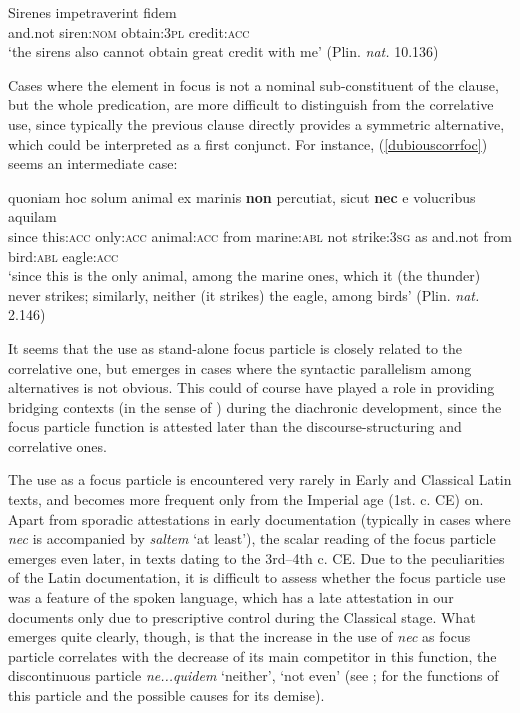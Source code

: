 \documentclass[output=paper,modfonts,nonflat,citecolor=brown,
showindex
]{langsci/langscibook}
\begin{document}
{\begin{exe}
\ex \label{focussirens}  Sirenes impetraverint fidem\\
and.not siren:{\textsc{nom}} obtain:{\textsc{3pl}} credit:{\textsc{acc}}\\

`the sirens also cannot obtain great credit with me' (Plin. {\emph{nat.}} 10.136)
\end{exe}}

\noindent Cases where the element in focus is not a nominal sub-constituent of the clause, but the whole predication, are more difficult to distinguish from the correlative use, since typically the previous clause directly provides a symmetric alternative, which could be interpreted as a first conjunct. For instance, (\ref{dubiouscorrfoc}) seems an intermediate case:

{\begin{exe}
\ex \label{dubiouscorrfoc} \gll quoniam hoc solum animal ex marinis {\textbf{non}} percutiat, sicut {\textbf{nec}} e volucribus aquilam\\
since this:{\textsc{acc}} only:{\textsc{acc}} animal:{\textsc{acc}} from marine:{\textsc{abl}} not strike:{\textsc{3sg}} as and.not from bird:{\textsc{abl}} eagle:{\textsc{acc}}\\

`since this is the only animal, among the marine ones, which it (the thunder) never strikes; similarly, neither (it strikes) the eagle, among birds' (Plin. {\emph{nat.}} 2.146)
\end{exe}}

\noindent It seems that the use as stand-alone focus particle is closely related to the correlative one, but emerges in cases where the syntactic parallelism among alternatives is not obvious. This could of course have played a role in providing bridging contexts (in the sense of \citealt{Heine02}) during the diachronic development, since the focus particle function is attested later than the discourse-structuring and correlative ones.

The use as a focus particle is encountered very rarely in Early and Classical Latin texts, and becomes more frequent only from the Imperial age (1st. c. CE) on. Apart from sporadic attestations in early documentation (typically in cases where {\emph{nec}} is accompanied by {\emph{saltem}} `at least'), the scalar reading of the focus particle emerges even later, in texts dating to the 3rd--4th c. CE. Due to the peculiarities of the Latin documentation, it is difficult to assess whether the focus particle use was a feature of the spoken language, which has a late attestation in our documents only due to prescriptive control during the Classical stage. What emerges quite clearly, though, is that the increase in the use of {\emph{nec}} as focus particle correlates with the decrease of its main competitor in this function, the discontinuous particle {\emph{ne...quidem}} `neither', `not even' (see \citealt[chapter 7]{Orlandini01}; \citealt[]{Gianollo17} for the functions of this particle and the possible causes for its demise).
\end{document}
